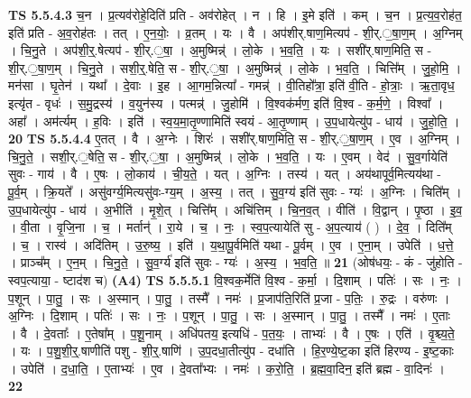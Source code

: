 \documentclass[17pt]{extarticle}
\begin{document}
                  \newline
                                \textbf{ TS 5.5.4.3} \newline
                  च॒न । प्र॒त्यव॑रोहे॒दिति॑ प्रति - अव॑रोहेत् । न । हि । इ॒मे इति॑ । कम् । च॒न । प्र॒त्य॒व॒रोह॑त॒ इति॑ प्रति - अ॒व॒रोह॑तः । तत् । ए॒न॒योः॒ । व्र॒तम् । यः । वै । अप॑शीर्.षाण॒मित्यप॑ - शी॒र्.॒षा॒ण॒म् । अ॒ग्निम् । चि॒नु॒ते । अप॑शी॒र्॒.षेत्यप॑ - शी॒र्.॒षा॒ । अ॒मुष्मिन्न्॑ । लो॒के । भ॒व॒ति॒ । यः । सशी॑र्.षाण॒मिति॒ स - शी॒र्.॒षा॒ण॒म् । चि॒नु॒ते । सशी॒र्॒.षेति॒ स - शी॒र्.॒षा॒ । अ॒मुष्मिन्न्॑ । लो॒के । भ॒व॒ति॒ । चित्ति᳚म् । जु॒हो॒मि॒ । मन॑सा । घृ॒तेन॑ । यथा᳚ । दे॒वाः । इ॒ह । आ॒गम॒न्नित्या᳚ - गमन्न्॑ । वी॒तिहो᳚त्रा॒ इति॑ वी॒ति - हो॒त्राः॒ । ऋ॒ता॒वृध॒ इत्यृ॑त - वृधः॑ । स॒मु॒द्रस्य॑ । व॒युन॑स्य । पत्मन्न्॑ । जु॒होमि॑ । वि॒श्वक॑र्मण॒ इति॑ वि॒श्व - क॒र्म॒णे॒ । विश्वा᳚ । अहा᳚ । अम॑र्त्यम् । ह॒विः । इति॑ । स्व॒य॒मा॒तृ॒ण्णामिति॑ स्वयं - आ॒तृ॒ण्णाम् । उ॒प॒धायेत्यु॑प - धाय॑ । जु॒हो॒ति॒ । \textbf{  20} \newline
                  \newline
                                \textbf{ TS 5.5.4.4} \newline
                  ए॒तत् । वै । अ॒ग्नेः । शिरः॑ । सशी॑र्.षाण॒मिति॒ स - शी॒र्.॒षा॒ण॒म् । ए॒व । अ॒ग्निम् । चि॒नु॒ते॒ । सशी॒र्.॒षेति॒ स - शी॒र्.॒षा॒ । अ॒मुष्मिन्न्॑ । लो॒के । भ॒व॒ति॒ । यः । ए॒वम् । वेद॑ । सु॒व॒र्गायेति॑ सुवः - गाय॑ । वै । ए॒षः । लो॒काय॑ । ची॒य॒ते॒ । यत् । अ॒ग्निः । तस्य॑ । यत् । अय॑थापूर्व॒मित्यय॑था - पू॒र्व॒म् । क्रि॒यते᳚ । असु॑वर्ग्य॒मित्यसु॑वः-ग्य॒म् । अ॒स्य॒ । तत् । सु॒व॒ग्य॑ इति॑ सुवः - ग्यः॑ । अ॒ग्निः । चिति᳚म् । उ॒प॒धायेत्यु॑प - धाय॑ । अ॒भीति॑ । मृ॒शे॒त् । चित्ति᳚म् । अचि॑त्तिम् । चि॒न॒व॒त् । वीति॑ । वि॒द्वान् । पृ॒ष्ठा । इ॒व॒ । वी॒ता । वृ॒जि॒ना । च॒ । मर्तान्॑ । रा॒ये । च॒ । नः॒ । स्व॒प॒त्यायेति॑ सु - अ॒प॒त्याय॑ ( ) । दे॒व॒ । दिति᳚म् । च॒ । रास्व॑ । अदि॑तिम् । उ॒रु॒ष्य॒ । इति॑ । य॒था॒पू॒र्वमिति॑ यथा - पू॒र्वम् । ए॒व । ए॒ना॒म् । उपेति॑ । ध॒त्ते॒ । प्राञ्च᳚म् । ए॒न॒म् । चि॒नु॒ते॒ । सु॒व॒र्ग्य॑ इति॑ सुवः - ग्यः॑ । अ॒स्य॒ । भ॒व॒ति॒ ॥ \textbf{  21 } \newline
                  \newline
                      (ओष॑धयः॒ - कं - जु॑होति - स्वप॒त्याया॒ - ष्टाद॑श च)  \textbf{(A4)} \newline \newline
                                \textbf{ TS 5.5.5.1} \newline
                  वि॒श्वक॒र्मेति॑ वि॒श्व - क॒र्मा॒ । दि॒शाम् । पतिः॑ । सः । नः॒ । प॒शून् । पा॒तु॒ । सः । अ॒स्मान् । पा॒तु॒ । तस्मै᳚ । नमः॑ । प्र॒जाप॑ति॒रिति॑ प्र॒जा - प॒तिः॒ । रु॒द्रः । वरु॑णः । अ॒ग्निः । दि॒शाम् । पतिः॑ । सः । नः॒ । प॒शून् । पा॒तु॒ । सः । अ॒स्मान् । पा॒तु॒ । तस्मै᳚ । नमः॑ । ए॒ताः । वै । दे॒वताः᳚ । ए॒तेषा᳚म् । प॒शू॒नाम् । अधि॑पतय॒ इत्यधि॑ - प॒त॒यः॒ । ताभ्यः॑ । वै । ए॒षः । एति॑ । वृ॒श्च्य॒ते॒ । यः । प॒शु॒शी॒र्॒.षाणीति॑ पशु - शी॒र्॒.षाणि॑ । उ॒प॒दधा॒तीत्यु॑प - दधा॑ति । हि॒र॒ण्ये॒ष्ट॒का इति॑ हिरण्य - इ॒ष्ट॒काः । उपेति॑ । द॒धा॒ति॒ । ए॒ताभ्यः॑ । ए॒व । दे॒वता᳚भ्यः । नमः॑ । क॒रो॒ति॒ । ब्र॒ह्म॒वा॒दिन॒ इति॑ ब्रह्म - वा॒दिनः॑ । \textbf{  22} \newline
\end{document}
